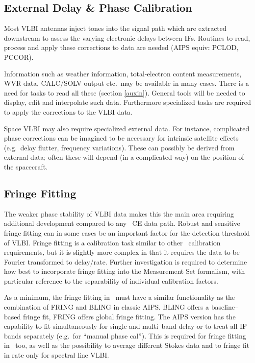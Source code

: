 \subsection{External Delay \& Phase Calibration} 

Most VLBI antennas inject tones into the signal path which are
extracted downstream to assess the varying electronic delays between
IFs. Routines to read, process and apply these corrections to data are
needed (AIPS equiv: PCLOD, PCCOR).

Information such as weather information, total-electron content
measurements, WVR data, CALC\slash SOLV output etc.\ may be available in
many cases. There is a need for tasks to read all these (section
\ref{auxin}). General tools will be needed to display, edit and
interpolate such data. Furthermore specialized tasks are required to
apply the corrections to the VLBI data.

Space VLBI may also require specialized external data.  For instance,
complicated phase corrections can be imagined to be necessary for
intrinsic satellite effects (e.g.\ delay flutter, frequency
variations). These can possibly be derived from external data; often
these will depend (in a complicated way) on the position of the
spacecraft.

\subsection{Fringe Fitting}

The weaker phase stability of VLBI data makes this the main area
requiring additional development compared to any \aipspp\ CE data
path. Robust and sensitive fringe fitting can in some cases be an
important factor for the detection threshold of VLBI. Fringe fitting
is a calibration task similar to other \aipspp\ calibration
requirements, but it is slightly more complex in that it requires the
data to be Fourier transformed to delay/rate. Further investigation
is required to determine how best to incorporate fringe fitting into the
Measurement Set formalism, with particular reference to the
separability of individual calibration factors.

As a minimum, the fringe fitting in \aipspp\ must have a similar
functionality as the combination of FRING and BLING in classic AIPS.
BLING offers a baseline--based fringe fit, FRING offers global fringe
fitting. The AIPS version has the capability to fit simultaneously for
single and multi--band delay or to treat all IF bands separately
(e.g.\ for ``manual phase cal''). This is required for fringe fitting
in \aipspp\ too, as well as the possibility to average different
Stokes data and to fringe fit in rate only for spectral line VLBI.

